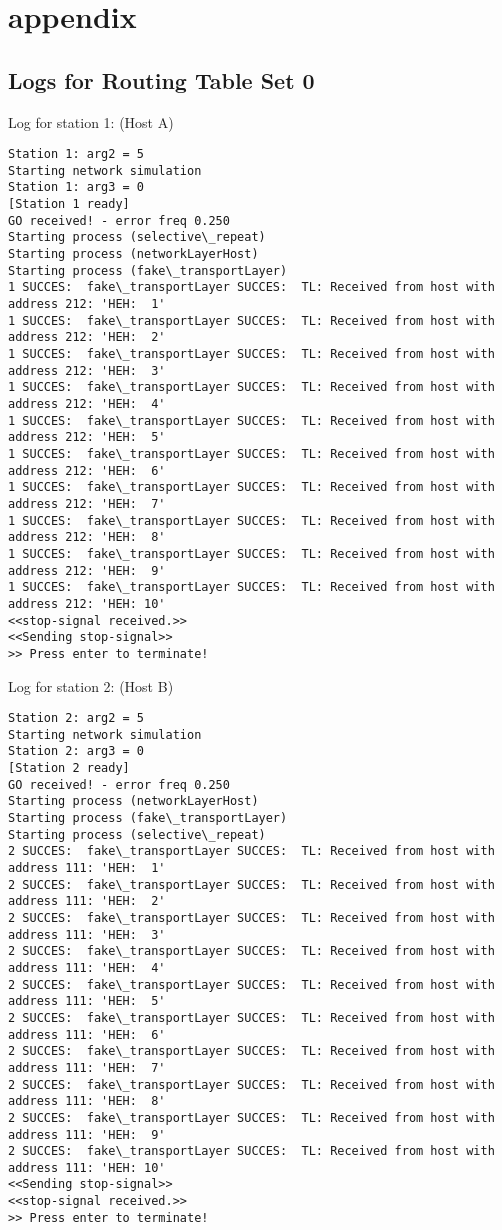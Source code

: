 \section{appendix}
\subsection{Logs for Routing Table Set 0}
Log for station 1: (Host A)
\begin{lstlisting}[breaklines=true]
Station 1: arg2 = 5
Starting network simulation
Station 1: arg3 = 0
[Station 1 ready]
GO received! - error freq 0.250
Starting process (selective\_repeat)
Starting process (networkLayerHost)
Starting process (fake\_transportLayer)
1 SUCCES:  fake\_transportLayer SUCCES:  TL: Received from host with address 212: 'HEH:  1'
1 SUCCES:  fake\_transportLayer SUCCES:  TL: Received from host with address 212: 'HEH:  2'
1 SUCCES:  fake\_transportLayer SUCCES:  TL: Received from host with address 212: 'HEH:  3'
1 SUCCES:  fake\_transportLayer SUCCES:  TL: Received from host with address 212: 'HEH:  4'
1 SUCCES:  fake\_transportLayer SUCCES:  TL: Received from host with address 212: 'HEH:  5'
1 SUCCES:  fake\_transportLayer SUCCES:  TL: Received from host with address 212: 'HEH:  6'
1 SUCCES:  fake\_transportLayer SUCCES:  TL: Received from host with address 212: 'HEH:  7'
1 SUCCES:  fake\_transportLayer SUCCES:  TL: Received from host with address 212: 'HEH:  8'
1 SUCCES:  fake\_transportLayer SUCCES:  TL: Received from host with address 212: 'HEH:  9'
1 SUCCES:  fake\_transportLayer SUCCES:  TL: Received from host with address 212: 'HEH: 10'
<<stop-signal received.>>
<<Sending stop-signal>>
>> Press enter to terminate!
\end{lstlisting}

Log for station 2: (Host B)
\begin{lstlisting}[breaklines=true]
Station 2: arg2 = 5
Starting network simulation
Station 2: arg3 = 0
[Station 2 ready]
GO received! - error freq 0.250
Starting process (networkLayerHost)
Starting process (fake\_transportLayer)
Starting process (selective\_repeat)
2 SUCCES:  fake\_transportLayer SUCCES:  TL: Received from host with address 111: 'HEH:  1'
2 SUCCES:  fake\_transportLayer SUCCES:  TL: Received from host with address 111: 'HEH:  2'
2 SUCCES:  fake\_transportLayer SUCCES:  TL: Received from host with address 111: 'HEH:  3'
2 SUCCES:  fake\_transportLayer SUCCES:  TL: Received from host with address 111: 'HEH:  4'
2 SUCCES:  fake\_transportLayer SUCCES:  TL: Received from host with address 111: 'HEH:  5'
2 SUCCES:  fake\_transportLayer SUCCES:  TL: Received from host with address 111: 'HEH:  6'
2 SUCCES:  fake\_transportLayer SUCCES:  TL: Received from host with address 111: 'HEH:  7'
2 SUCCES:  fake\_transportLayer SUCCES:  TL: Received from host with address 111: 'HEH:  8'
2 SUCCES:  fake\_transportLayer SUCCES:  TL: Received from host with address 111: 'HEH:  9'
2 SUCCES:  fake\_transportLayer SUCCES:  TL: Received from host with address 111: 'HEH: 10'
<<Sending stop-signal>>
<<stop-signal received.>>
>> Press enter to terminate!
\end{lstlisting}

